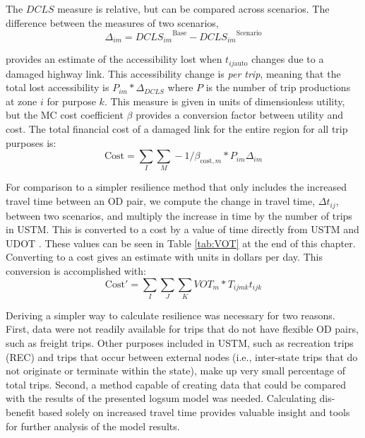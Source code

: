 The \(DCLS\) measure is relative, but can be compared across
scenarios. The difference between the measures of two scenarios,
\begin{equation}
\Delta_{im} = {DCLS_{im}}^{\mathrm{Base}} - {DCLS_{im}}^{\mathrm{Scenario}}
  \label{eq:deltas}
\end{equation}

 \noindent provides an estimate of the accessibility lost when
 \(t_{ij\mathrm{auto}}\)
changes due to a damaged highway link. This accessibility change is \emph{per
trip},
meaning that the total lost accessibility is \(P_{im} * \Delta_{DCLS}\) where
\(P\) is
the number of trip productions at zone \(i\) for purpose \(k\). This measure is
given in units of dimensionless utility, but the MC cost coefficient
\(\beta\) provides a conversion factor between utility and cost. The total
financial
cost of a damaged link for the entire region for all trip purposes is:
\begin{equation}
\mathrm{Cost} = \sum_{I}\sum_{M} -1 / \beta_{\mathrm{cost},m} * P_{im}
\Delta_{im}
  \label{eq:totalcost}
\end{equation}

For comparison to a simpler resilience method that only includes the increased
travel time between an OD pair, we compute the change in travel
time, \(\Delta t_{ij}\), between two scenarios, and multiply the increase in
time by the number of trips in USTM. This is converted to a cost by a value of
time directly from USTM and UDOT \citep{UtahDepartmentofTransportation2020}. These
values can be seen in Table \ref{tab:VOT} at the end of this chapter. Converting to
a cost gives an estimate with units in
dollars per day. This conversion is accomplished with:
\begin{equation}
\mathrm{Cost}' =  \sum_I \sum_J \sum_K VOT_{m} * T_{ijmk} t_{ijk}
  \label{eq:ttmethod}
\end{equation}

\noindent Deriving a simpler way to calculate resilience was necessary for two
reasons. First, data were not readily available for trips that do not have
flexible OD pairs, such as freight trips. Other purposes included in USTM,
such as recreation trips (REC) and trips that occur between external nodes
(i.e., inter-state trips that do not originate or terminate within the state),
make up very small percentage of total trips. Second, a method capable of
creating data that could be compared with the results of the presented logsum model
was needed. Calculating dis-benefit
based solely on increased travel time provides valuable insight and tools for
further analysis of the model results.

